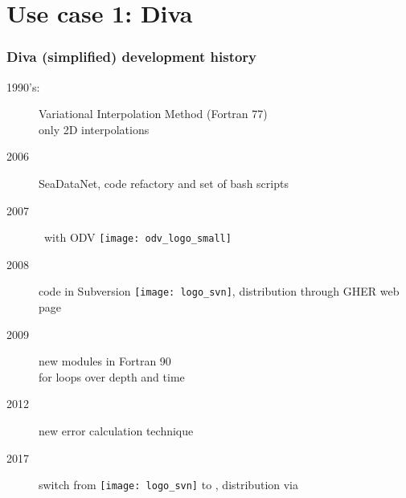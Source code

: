 \section{Use case 1: Diva}

\begin{frame}


\end{frame}


\begin{frame}[c]
\frametitle{Diva (simplified) development history}

\begin{description}
\item[1990’s:] Variational Interpolation Method (Fortran 77)\\
only 2D interpolations
\item[2006] SeaDataNet, code refactory and set of bash scripts 
\item[2007] \faPlug~with ODV \texttt{[image: odv\_logo\_small]}
\item[2008] code in Subversion \texttt{[image: logo\_svn]}, distribution through GHER web page
\item[2009] new modules in Fortran 90\\
 for loops over depth and time 
\item[2012] new error calculation technique
\item[2017] switch from \texttt{[image: logo\_svn]} to \faGit, distribution via \href{https://github.com/gher-ulg/DIVA}{\faGithub}

\end{description}
\end{frame}


